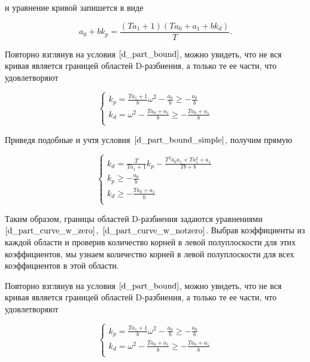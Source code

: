 \documentclass[12pt,a4paper]{article}
\begin{document}
и уравнение кривой запишется в виде

$$ a_0 + bk_p = \frac{(Ta_1+1)(Ta_0+a_1+bk_d)}{T}. $$

Повторно взглянув на условия $\eqref{d_part_bound}$, можно увидеть, что не вся кривая является границей областей D-разбиения, а только те ее части, что удовлетворяют

\begin{equation}
	\label{d_part_bound_simple}
	\begin{cases}
		k_p = \frac{Ta_1+1}{b}\omega^2 -\frac{a_0}{b} \ge -\frac{a_0}{b} \\
		k_d = \omega^2 -\frac{Ta_0+a_1}{b} \ge -\frac{Ta_0+a_1}{b} \\
	\end{cases}
\end{equation}

Приведя подобные и учтя условия~$\eqref{d_part_bound_simple}$, получим прямую

\begin{equation}
	\label{d_part_curve_w_notzero}
	\begin{cases}
		k_d = \frac{T}{Ta_1+1}k_p - \frac{T^2a_0a_1 + Ta_1^2+a_1}{Tb+b} \\
		k_p \ge -\frac{a_0}{b} \\
		k_d \ge -\frac{Ta_0+a_1}{b} \\
	\end{cases}
\end{equation}

Таким образом, границы областей D-разбиения задаются уравнениями~$\eqref{d_part_curve_w_zero}$,~$\eqref{d_part_curve_w_notzero}$. Выбрав коэффициенты из каждой области и проверив количество корней в левой полуплоскости для этих коэффициентов, мы узнаем количество корней в левой полуплоскости для всех коэффициентов в этой области.

Повторно взглянув на условия $\eqref{d_part_bound}$, можно увидеть, что не вся кривая является границей областей D-разбиения, а только те ее части, что удовлетворяют

\begin{equation}
	\label{d_part_bound_simple}
	\begin{cases}
		k_p = \frac{Ta_1+1}{b}\omega^2 -\frac{a_0}{b} \ge -\frac{a_0}{b} \\
		k_d = \omega^2 -\frac{Ta_0+a_1}{b} \ge -\frac{Ta_0+a_1}{b} \\
	\end{cases}
\end{equation}
\end{document}
